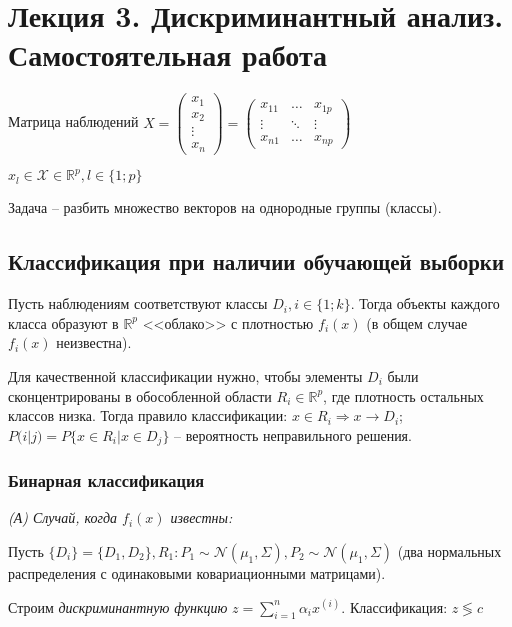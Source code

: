 \documentclass[main.tex]{subfiles}
\begin{document}
\section{Лекция 3. Дискриминантный анализ. Самостоятельная работа}

Матрица наблюдений $ X = \begin{pmatrix} x_1 \\ x_2 \\ \vdots \\ x_n \end{pmatrix}
= \begin{pmatrix}
x_{11} & \dots & x_{1p} \\
\vdots & \ddots & \vdots \\
x_{n1} & \dots & x_{np}
\end{pmatrix} $

$ x_l \in \mathcal{X} \in \mathds{R}^p, l \in \{1;p\} $

Задача -- разбить множество векторов на однородные группы (классы).

\subsection{Классификация при наличии обучающей выборки}

Пусть наблюдениям соответствуют классы $ D_i, i \in \{1;k\} $.
Тогда объекты каждого класса образуют в $ \mathds{R}^p $ <<облако>> с плотностью $ f_i(x) $ (в общем случае $ f_i(x) $ неизвестна).

Для качественной классификации нужно, чтобы элементы $ D_i $ были сконцентрированы в обособленной области $ R_i \in \mathds{R}^p $, где плотность остальных классов низка.
Тогда правило классификации: $ x \in R_i \Rightarrow x \to D_i$; $ P(i|j) = P\{x \in R_i | x \in D_j \} $ -- вероятность неправильного решения.


\subsubsection{Бинарная классификация}

\emph{(А) Случай, когда $f_i(x)$ известны:}

Пусть $ \{D_i\} = \{D_1, D_2\}, R_1 : P_1 \sim \mathcal{N}\left(\mu_1, \Sigma \right), P_2 \sim \mathcal{N}\left(\mu_1, \Sigma \right) $ (два нормальных распределения с одинаковыми ковариационными матрицами).

Строим \emph{дискриминантную функцию} $ z = \sum_{i=1}^{n} \alpha_i x^{(i)} $.
Классификация: $ z \lessgtr c $
\end{document}
